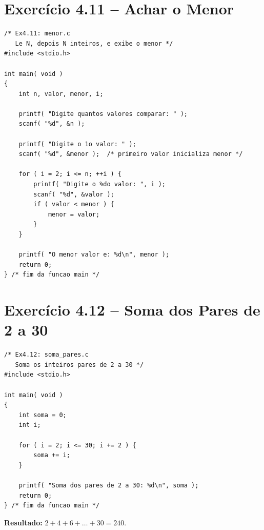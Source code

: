 \documentclass[12pt,a4paper]{article}
\begin{document}
\section{Exercício 4.11 -- Achar o Menor}

\begin{respostabox}
\begin{lstlisting}
/* Ex4.11: menor.c
   Le N, depois N inteiros, e exibe o menor */
#include <stdio.h>

int main( void )
{
    int n, valor, menor, i;

    printf( "Digite quantos valores comparar: " );
    scanf( "%d", &n );

    printf( "Digite o 1o valor: " );
    scanf( "%d", &menor );  /* primeiro valor inicializa menor */

    for ( i = 2; i <= n; ++i ) {
        printf( "Digite o %do valor: ", i );
        scanf( "%d", &valor );
        if ( valor < menor ) {
            menor = valor;
        }
    }

    printf( "O menor valor e: %d\n", menor );
    return 0;
} /* fim da funcao main */
\end{lstlisting}
\end{respostabox}

\section{Exercício 4.12 -- Soma dos Pares de 2 a 30}

\begin{respostabox}
\begin{lstlisting}
/* Ex4.12: soma_pares.c
   Soma os inteiros pares de 2 a 30 */
#include <stdio.h>

int main( void )
{
    int soma = 0;
    int i;

    for ( i = 2; i <= 30; i += 2 ) {
        soma += i;
    }

    printf( "Soma dos pares de 2 a 30: %d\n", soma );
    return 0;
} /* fim da funcao main */
\end{lstlisting}

\textbf{Resultado:} $2+4+6+\ldots+30 = 240$.
\end{respostabox}

\end{document}
